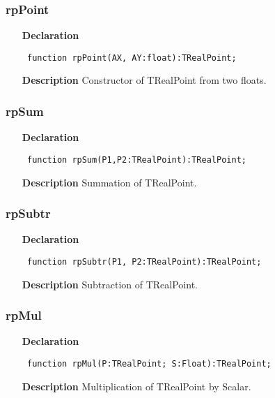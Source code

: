 \documentclass[12pt,a4paper,oneside]{report}
\newcommand{\declarationitem}[1]{\textbf{#1}}
\newcommand{\descriptiontitle}[1]{\textbf{#1}}
\newcommand{\code}[1]{\texttt{#1}}
\begin{document}
\subsubsection{rpPoint}
\label{uRealPoints-rpPoint}
\begin{itemize}\item[\declarationitem{Declaration}\hfill]
\begin{flushleft}
\code{
function rpPoint(AX, AY:float):TRealPoint;}
\end{flushleft}
\par
\item[\descriptiontitle{Description}]
Constructor of TRealPoint from two floats.
\end{itemize}

\subsubsection{rpSum}
\label{uRealPoints-rpSum}
\begin{itemize}\item[\declarationitem{Declaration}\hfill]
\begin{flushleft}
\code{
function rpSum(P1,P2:TRealPoint):TRealPoint;}
\end{flushleft}
\par
\item[\descriptiontitle{Description}]
Summation of TRealPoint.
\end{itemize}

\subsubsection{rpSubtr}
\label{uRealPoints-rpSubtr}
\begin{itemize}\item[\declarationitem{Declaration}\hfill]
\begin{flushleft}
\code{
function rpSubtr(P1, P2:TRealPoint):TRealPoint;}
\end{flushleft}
\par
\item[\descriptiontitle{Description}]
Subtraction of TRealPoint.
\end{itemize}

\subsubsection{rpMul}
\label{uRealPoints-rpMul}
\begin{itemize}\item[\declarationitem{Declaration}\hfill]
\begin{flushleft}
\code{
function rpMul(P:TRealPoint; S:Float):TRealPoint;}
\end{flushleft}
\par
\item[\descriptiontitle{Description}]
Multiplication of TRealPoint by Scalar.
\end{itemize}
\end{document}

